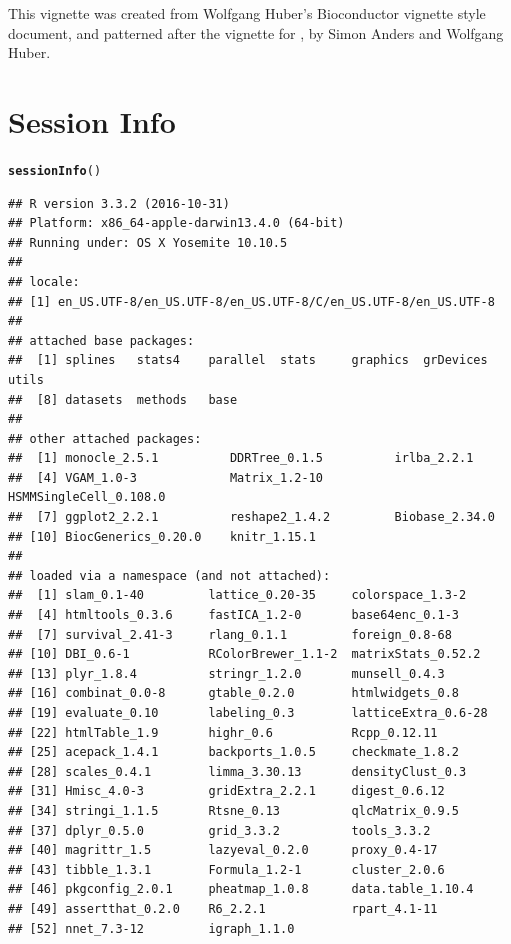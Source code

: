 \documentclass[10pt,oneside]{article}\usepackage[]{graphicx}\usepackage[]{color}
\makeatletter
\newcommand{\hlstd}[1]{\textcolor[rgb]{0.345,0.345,0.345}{#1}}%
\newcommand{\hlkwd}[1]{\textcolor[rgb]{0.737,0.353,0.396}{\textbf{#1}}}%
\newenvironment{kframe}{%
 \def\at@end@of@kframe{}%
 \ifinner\ifhmode%
  \def\at@end@of@kframe{\end{minipage}}%
  \begin{minipage}{\columnwidth}%
 \fi\fi%
 \def\FrameCommand##1{\hskip\@totalleftmargin \hskip-\fboxsep
 \colorbox{shadecolor}{##1}\hskip-\fboxsep
     \hskip-\linewidth \hskip-\@totalleftmargin \hskip\columnwidth}%
 \MakeFramed {\advance\hsize-\width
   \@totalleftmargin\z@ \linewidth\hsize
   \@setminipage}}%
 {\par\unskip\endMakeFramed%
 \at@end@of@kframe}
\newenvironment{knitrout}{}{} %
\makeatother
\begin{document}
 This vignette was created from Wolfgang Huber's Bioconductor vignette style document, and patterned after the vignette for , by Simon Anders and Wolfgang Huber.

\section{Session Info}
\begin{knitrout}
\color{fgcolor}\begin{kframe}
\begin{alltt}
\hlkwd{sessionInfo}\hlstd{()}
\end{alltt}
\begin{verbatim}
## R version 3.3.2 (2016-10-31)
## Platform: x86_64-apple-darwin13.4.0 (64-bit)
## Running under: OS X Yosemite 10.10.5
## 
## locale:
## [1] en_US.UTF-8/en_US.UTF-8/en_US.UTF-8/C/en_US.UTF-8/en_US.UTF-8
## 
## attached base packages:
##  [1] splines   stats4    parallel  stats     graphics  grDevices utils    
##  [8] datasets  methods   base     
## 
## other attached packages:
##  [1] monocle_2.5.1          DDRTree_0.1.5          irlba_2.2.1           
##  [4] VGAM_1.0-3             Matrix_1.2-10          HSMMSingleCell_0.108.0
##  [7] ggplot2_2.2.1          reshape2_1.4.2         Biobase_2.34.0        
## [10] BiocGenerics_0.20.0    knitr_1.15.1          
## 
## loaded via a namespace (and not attached):
##  [1] slam_0.1-40         lattice_0.20-35     colorspace_1.3-2   
##  [4] htmltools_0.3.6     fastICA_1.2-0       base64enc_0.1-3    
##  [7] survival_2.41-3     rlang_0.1.1         foreign_0.8-68     
## [10] DBI_0.6-1           RColorBrewer_1.1-2  matrixStats_0.52.2 
## [13] plyr_1.8.4          stringr_1.2.0       munsell_0.4.3      
## [16] combinat_0.0-8      gtable_0.2.0        htmlwidgets_0.8    
## [19] evaluate_0.10       labeling_0.3        latticeExtra_0.6-28
## [22] htmlTable_1.9       highr_0.6           Rcpp_0.12.11       
## [25] acepack_1.4.1       backports_1.0.5     checkmate_1.8.2    
## [28] scales_0.4.1        limma_3.30.13       densityClust_0.3   
## [31] Hmisc_4.0-3         gridExtra_2.2.1     digest_0.6.12      
## [34] stringi_1.1.5       Rtsne_0.13          qlcMatrix_0.9.5    
## [37] dplyr_0.5.0         grid_3.3.2          tools_3.3.2        
## [40] magrittr_1.5        lazyeval_0.2.0      proxy_0.4-17       
## [43] tibble_1.3.1        Formula_1.2-1       cluster_2.0.6      
## [46] pkgconfig_2.0.1     pheatmap_1.0.8      data.table_1.10.4  
## [49] assertthat_0.2.0    R6_2.2.1            rpart_4.1-11       
## [52] nnet_7.3-12         igraph_1.1.0
\end{verbatim}
\end{kframe}
\end{knitrout}



\end{document}
